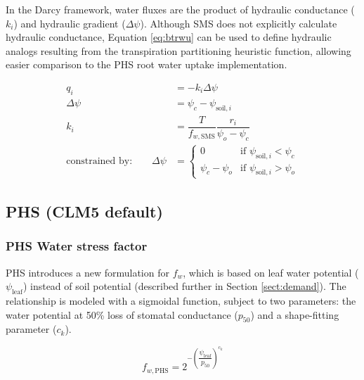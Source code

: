 \documentclass[draft,linenumbers]{agujournal}
\begin{document}
    In the Darcy framework, water fluxes are the product of hydraulic conductance ($k_i$) and hydraulic gradient ($\Delta\psi$).
    Although SMS does not explicitly calculate hydraulic conductance, Equation \ref{eq:btrwu} can be used to define hydraulic analogs resulting from the transpiration partitioning heuristic function, 
    allowing easier comparison to the PHS root water uptake implementation.
    
    \begin{linenomath*}
    \begin{equation} \begin{aligned}
    q_i &= -k_i\Delta\psi \\
    \Delta\psi &=  \psi_{c}-\psi_{\text{soil},i} \\
    k_i &= \dfrac{T}{f_{w,\text{SMS}}} \dfrac{r_i}{\psi_{o}-\psi_{c}} \\
    \mbox{constrained by:} \qquad
    \Delta\psi &=
    \begin{cases}
    0                          & \text{if } \psi_{\text{soil},i}<\psi_{c}  \\
    \psi_{c}-\psi_{o} & \text{if } \psi_{\text{soil},i}>\psi_{o}
    \label{kb}
    \end{cases}
    \end{aligned}\end{equation}
    \end{linenomath*}
    
    
   
\subsection{PHS (CLM5 default)}
    \label{sect:phs}
    \subsubsection{PHS Water stress factor}
    \label{sect:fwphs}
    
    PHS introduces a new formulation for $f_w$, which is based on leaf water potential ($\psi_{\text{leaf}}$) instead of soil potential (described further in Section \ref{sect:demand}). The relationship is modeled with a sigmoidal function, subject to two parameters: the water potential at 50\% loss of stomatal conductance ($p_{50}$) and a shape-fitting parameter ($c_k$).
    
    \begin{linenomath*}
    \begin{equation}
    f_{w,\text{PHS}} = 2^{-\left(\dfrac{\psi_{\text{leaf}}}{p_{50}}\right)^{c_k}}
    \label{eq:fwphs}
    \end{equation}
    \end{linenomath*}
    
\end{document}
